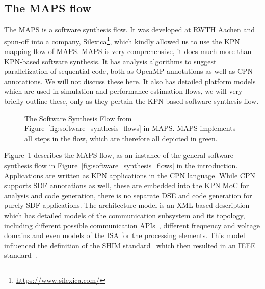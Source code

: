 \subsection{The MAPS flow}

The \acl{MAPS} is a software synthesis flow. It was developed at RWTH Aachen and spun-off into a company, Silexica\footnote{\url{https://www.silexica.com/}}, which kindly allowed us to use the \ac{KPN} mapping flow of \ac{MAPS}.
\ac{MAPS} is very comprehensive, it does much more than \ac{KPN}-based software synthesis.
It has analysis algorithms to suggest parallelization of sequential code, both as OpenMP annotations as well as \ac{CPN} annotations. We will not discuss these here.
It also has detailed platform models which are used in simulation and performance estimation flows, we will very briefly outline these, only as they pertain the \ac{KPN}-based software synthesis flow. 

\begin{figure}[h]
	\centering
   \resizebox{0.95\textwidth}{!}{}
   \caption{The Software Synthesis Flow from Figure~\ref{fig:software_synthesis_flows} in \ac{MAPS}. \ac{MAPS} implements all steps in the flow, which are therefore all depicted in green.} 
	\label{fig:maps_flow}
\end{figure}

Figure~\ref{fig:maps_flow} describes the \ac{MAPS} flow, as an instance of the general software synthesis flow in Figure~\ref{fig:software_synthesis_flows} in the introduction.
Applications are written as \ac{KPN} applications in the \ac{CPN} language.
While \ac{CPN} supports \ac{SDF} annotations as well, these are embedded into the \ac{KPN} \ac{MoC} for analysis and code generation, there is no separate \ac{DSE} and code generation for purely-\ac{SDF} applications.
The architecture model is an \acs{XML}-based description which has detailed models of the communication subsystem and its topology,
including different possible communication \acsp{API}~\cite{odendahl2013split}, different frequency and voltage domains and even models of the \ac{ISA} for the processing elements.
This model influenced the definition of the SHIM standard~\cite{mca_shim15} which then resulted in an IEEE standard~\cite{ieee-2804-2019}. 
 
